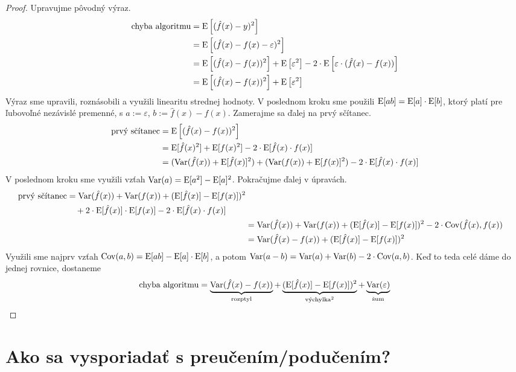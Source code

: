 \begin{proof}
  Upravujme pôvodný výraz.
  \begin{align}
    \chalg
      &= \E \left[ (\hat{f}(x) - y)^2 \right] \\
      &= \E \left[ (\hat{f}(x) - f(x) - \varepsilon)^2 \right] \\
      &= \E \left[ (\hat{f}(x) - f(x))^2 \right] + \E \left[ \varepsilon^2 \right] - 2 \cdot \E \left[ \varepsilon \cdot (\hat{f}(x) - f(x)) \right] \\
      &= \E \left[ (\hat{f}(x) - f(x))^2 \right] + \E \left[ \varepsilon^2 \right]
  \end{align}
  Výraz sme upravili, roznásobili a využili linearitu strednej hodnoty.
  V poslednom kroku sme použili $\E[ab] = \E[a] \cdot \E[b]$, ktorý
  platí pre ľubovoľné nezávislé premenné, s $a := \varepsilon$,
  $b := \hat{f}(x) - f(x)$. Zamerajme sa ďalej na prvý sčítanec.
  \begin{align}
    \text{prvý sčítanec}
      &= \E \left[ (\hat{f}(x) - f(x))^2 \right] \\
      &= \E[\hat{f}(x)^2] + \E[f(x)^2] - 2 \cdot \E[\hat{f}(x) \cdot f(x)] \\
      &= (\Var(\hat{f}(x)) + \E[\hat{f}(x)]^2) + (\Var(f(x)) + \E[f(x)]^2) - 2 \cdot \E[\hat{f}(x) \cdot f(x)]
  \end{align}
  V poslednom kroku sme využili vzťah $\Var(a) = \E[a^2] - \E[a]^2$.
  Pokračujme ďalej v úpravách.
  \begin{align}
    \begin{split}
      \text{prvý sčítanec}
        &= \Var(\hat{f}(x)) + \Var(f(x)) + (\E[\hat{f}(x)] - \E[f(x)])^2 \\
        &\quad + 2 \cdot \E[\hat{f}(x)] \cdot \E[f(x)] - 2 \cdot \E[\hat{f}(x) \cdot f(x)]
    \end{split} \\
    &= \Var(\hat{f}(x)) + \Var(f(x)) + (\E[\hat{f}(x)] - \E[f(x)])^2 - 2 \cdot \Cov(\hat{f}(x), f(x)) \\
    &= \Var(\hat{f}(x) - f(x)) + (\E[\hat{f}(x)] - \E[f(x)])^2
  \end{align}
  Využili sme najprv vzťah $\Cov(a, b) = \E[ab] - \E[a] \cdot \E[b]$,
  a potom $\Var(a - b) = \Var(a) + \Var(b) - 2 \cdot \Cov(a, b)$.
  Keď to teda celé dáme do jednej rovnice, dostaneme
  $$
  \chalg
      = \underbrace{\Var(\hat{f}(x) - f(x))}_{\text{\normalfont rozptyl}}
      + \underbrace{(\E[\hat{f}(x)] - \E[f(x)])^2}_{\text{\normalfont výchylka}^2}
      + \underbrace{\Var(\varepsilon)}_{\text{\normalfont šum}}
  $$
\end{proof}



\section{Ako sa vysporiadať s preučením/podučením?}

